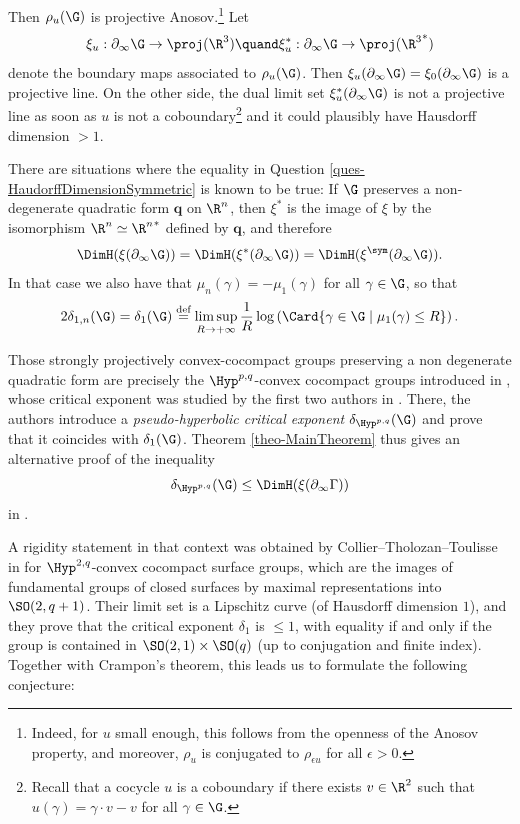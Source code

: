 Then $\rho_u(\G)$ is projective Anosov.\footnote{Indeed, for $u$ small enough, this follows from the openness of the Anosov property, and moreover, $\rho_u$ is conjugated to $\rho_{\epsilon u}$ for all $\epsilon>0$.} Let
\[
\xi_u: \partial_\infty \G \to \proj(\R^3)\quand \xi_u^*: \partial_\infty \G \to \proj({\R^3}^*)
\]
denote the boundary maps associated to $\rho_u(\G)$. Then $\xi_u(\partial_\infty\G) = \xi_0(\partial_\infty \G)$ is a projective line. On the other side, the dual limit set $\xi_u^*(\partial_\infty \G)$ is not a projective line as soon as $u$ is not a coboundary\footnote{Recall that a cocycle $u$ is a coboundary if there exists $v\in \R^2$ such that $u(\gamma) = \gamma \cdot v - v$ for all $\gamma \in \G$.} and it could plausibly have Hausdorff dimension $>1$.

There are situations where the equality in Question \ref{ques-HaudorffDimensionSymmetric} is known to be true: If $\G$ preserves a non-degenerate quadratic form $\boldsymbol{q}$ on $\R^n$, then $\xi^*$ is the image of $\xi$ by the isomorphism $\R^n\simeq {\R^n}^*$ defined by $\boldsymbol{q}$, and therefore
\[\DimH(\xi(\partial_\infty \G)) = \DimH(\xi^*(\partial_\infty \G)) = \DimH(\xi^{\sym}(\partial_\infty \G)).\]
In that case we also have that $\mu_n(\gamma) = - \mu_1(\gamma)$ for all $\gamma \in \G$, so that
\[2\delta_{1,n}(\G) = \delta_1(\G) \overset{\textrm{def}}{=} \limsup_{R\to +\infty} \frac{1}{R} \log \left(\Card \{\gamma \in \G \mid \mu_1(\gamma) \leq R\}\right).\]

Those strongly projectively convex-cocompact groups preserving a non degenerate quadratic form are precisely the $\Hyp^{p,q}$-convex cocompact groups introduced in \cite{DGKSOpq}, whose critical exponent was studied by the first two authors in \cite{GM18}. There, the authors introduce a \emph{pseudo-hyperbolic critical exponent} $\delta_{\Hyp^{p,q}}(\G)$ and prove that it coincides with $\delta_1(\G)$. Theorem \ref{theo-MainTheorem} thus gives an alternative proof of the inequality
\[\delta_{\Hyp^{p,q}}(\G) \leq \DimH(\xi(\partial_\infty\Gamma))\]
in \cite[Th.\,1.2]{GM18}.

A rigidity statement in that context was obtained by Collier--Tholozan--Toulisse in \cite{CCT17} for $\Hyp^{2,q}$-convex cocompact surface groups, which are the images of fundamental groups of closed surfaces by maximal representations into $\SO(2,q+1)$. Their limit set is a Lipschitz curve (of Hausdorff dimension $1$), and they prove that the critical exponent $\delta_1$ is $\leq 1$, with equality if and only if the group is contained in $\SO(2,1)\times \SO(q)$ (up to conjugation and finite index). Together with Crampon's theorem, this leads us to formulate the following conjecture:

